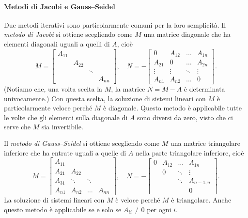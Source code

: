 \documentclass[a4paper]{report}
\theoremstyle{definiton}
\theoremstyle{remark}
\begin{document}
\paragraph{Metodi di Jacobi e Gauss--Seidel} Due metodi iterativi sono particolarmente comuni per la loro semplicità. Il \emph{metodo di Jacobi} si ottiene scegliendo come $M$ una matrice diagonale che ha elementi diagonali uguali a quelli di $A$, cioè
\[
M = \begin{bmatrix}
    A_{11}\\
    & A_{22}\\
    & & \ddots \\
    & & & A_{nn}
\end{bmatrix}, \quad N = -\begin{bmatrix}
    0 & A_{12} & \dots & A_{1n}\\
    A_{21} & 0 & \dots & A_{2n}\\
    \vdots & \vdots & \ddots & \vdots\\
    A_{n1} & A_{n2} & \dots & 0
\end{bmatrix}.
\]
(Notiamo che, una volta scelta la $M$, la matrice $N = M-A$ è determinata univocamente.) Con questa scelta, la soluzione di sistemi lineari con $M$ è particolarmente veloce perché $M$ è diagonale. Questo metodo è applicabile tutte le volte che gli elementi sulla diagonale di $A$ sono diversi da zero, visto che ci serve che $M$ sia invertibile.

Il \emph{metodo di Gauss--Seidel} si ottiene scegliendo come $M$ una matrice triangolare inferiore che ha entrate uguali a quelle di $A$ nella parte triangolare inferiore, cioè
\[
M = \begin{bmatrix}
    A_{11}\\
    A_{21} & A_{22}\\
    A_{31}& \ddots & \ddots \\
    A_{n1}& A_{n2} &\dots & A_{nn}
\end{bmatrix}
, \quad N =-\begin{bmatrix}
    0& A_{12} & \dots & A_{1n}\\
    & 0 & \ddots & \vdots\\
    &  & \ddots & A_{n-1,n}\\
    & &  & 0
\end{bmatrix}.
\]
La soluzione di sistemi lineari con $M$ è veloce perché $M$ è triangolare. Anche questo metodo è applicabile se e solo se $A_{ii} \neq 0$ per ogni $i$. 
\end{document}
